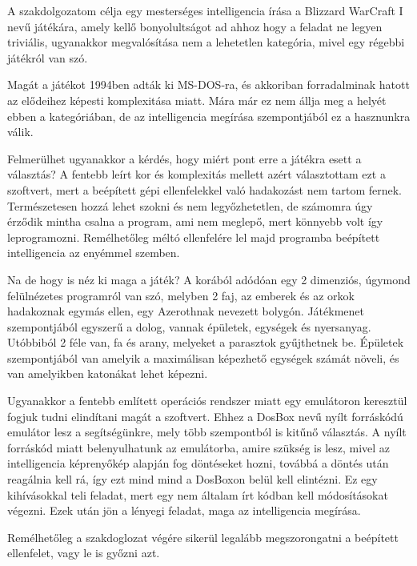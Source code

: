 
A szakdolgozatom célja egy mesterséges intelligencia írása a Blizzard WarCraft I nevű játékára, amely kellő bonyolultságot ad ahhoz hogy a feladat ne legyen triviális, ugyanakkor megvalósítása nem a lehetetlen kategória, mivel egy régebbi játékról van szó.

Magát a játékot 1994ben adták ki MS-DOS-ra, és akkoriban forradalminak hatott az elődeihez képesti komplexitása miatt. Mára már ez nem állja meg a helyét ebben a kategóriában, de az intelligencia megírása szempontjából ez a hasznunkra válik. 

Felmerülhet ugyanakkor a kérdés, hogy miért pont erre a játékra esett a választás? A fentebb leírt kor és komplexitás mellett azért választottam ezt a szoftvert, mert a beépített gépi ellenfelekkel való hadakozást nem tartom fernek. Természetesen hozzá lehet szokni és nem legyőzhetetlen, de számomra úgy érződik mintha csalna a program, ami nem meglepő, mert könnyebb volt így leprogramozni. Remélhetőleg méltó ellenfelére lel majd programba beépített intelligencia az enyémmel szemben.

Na de hogy is néz ki maga a játék? A korából adódóan egy 2 dimenziós, úgymond felülnézetes programról van szó, melyben 2 faj, az emberek és az orkok hadakoznak egymás ellen, egy Azerothnak nevezett bolygón. Játékmenet szempontjából egyszerű a dolog, vannak épületek, egységek és nyersanyag. Utóbbiból 2 féle van, fa és arany, melyeket a parasztok gyűjthetnek be. Épületek szempontjából van amelyik a maximálisan képezhető egységek számát növeli, és van amelyikben katonákat lehet képezni. 

Ugyanakkor a fentebb említett operációs rendszer miatt egy emulátoron keresztül fogjuk tudni elindítani magát a szoftvert. Ehhez a DosBox nevű nyílt forráskódú emulátor lesz a segítségünkre, mely több szempontból is kitűnő választás. A nyílt forráskód miatt belenyulhatunk az emulátorba, amire szükség is lesz, mivel az intelligencia képrenyőkép alapján fog döntéseket hozni, továbbá a döntés után reagálnia kell rá, így ezt mind mind a DosBoxon belül kell elintézni. Ez egy kihívásokkal teli feladat, mert egy nem általam írt kódban kell módosításokat végezni. Ezek után jön a lényegi feladat, maga az intelligencia megírása. 

Remélhetőleg a szakdoglozat végére sikerül legalább megszorongatni a beépített ellenfelet, vagy le is győzni azt.
